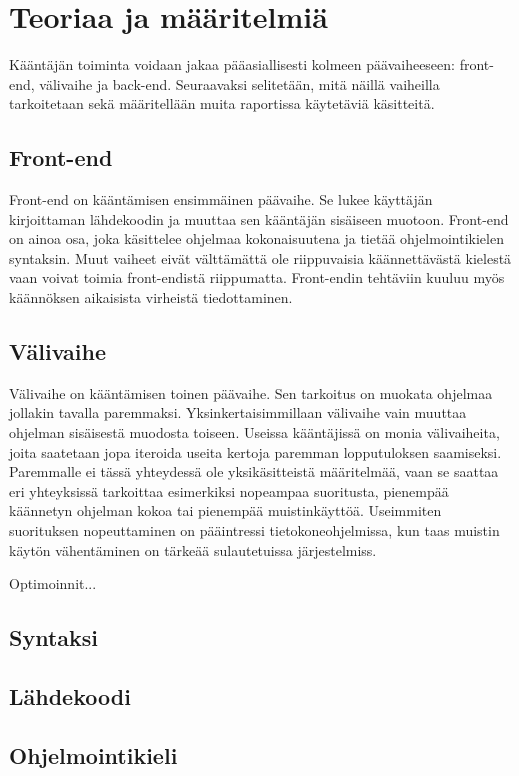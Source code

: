 \section{Teoriaa ja määritelmiä}
Kääntäjän toiminta voidaan jakaa pääasiallisesti kolmeen päävaiheeseen:
front-end, välivaihe ja back-end.
Seuraavaksi selitetään, mitä näillä vaiheilla tarkoitetaan
sekä määritellään muita raportissa käytetäviä käsitteitä.


\subsection{Front-end}
Front-end on kääntämisen ensimmäinen päävaihe.
Se lukee käyttäjän kirjoittaman lähdekoodin
ja muuttaa sen kääntäjän sisäiseen muotoon.
Front-end on ainoa osa, joka käsittelee ohjelmaa kokonaisuutena
ja tietää ohjelmointikielen syntaksin.
Muut vaiheet eivät välttämättä ole riippuvaisia käännettävästä
kielestä vaan voivat toimia front-endistä riippumatta.
Front-endin tehtäviin kuuluu myös käännöksen aikaisista virheistä tiedottaminen.

\subsection{Välivaihe}
Välivaihe on kääntämisen toinen päävaihe.
Sen tarkoitus on muokata ohjelmaa jollakin tavalla paremmaksi.
Yksinkertaisimmillaan välivaihe vain muuttaa ohjelman sisäisestä
muodosta toiseen.
Useissa kääntäjissä on monia välivaiheita, joita saatetaan jopa
iteroida useita kertoja paremman lopputuloksen saamiseksi.
Paremmalle ei tässä yhteydessä ole yksikäsitteistä määritelmää,
vaan se saattaa eri yhteyksissä tarkoittaa esimerkiksi
nopeampaa suoritusta, pienempää käännetyn ohjelman kokoa
tai pienempää muistinkäyttöä. Useimmiten suorituksen nopeuttaminen
on pääintressi tietokoneohjelmissa, kun taas muistin käytön
vähentäminen on tärkeää sulautetuissa järjestelmiss.

Optimoinnit...


\subsection{Syntaksi}
\subsection{Lähdekoodi}
\subsection{Ohjelmointikieli}